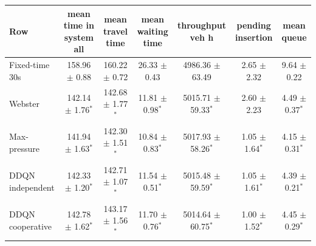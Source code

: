 \begin{tabular}{lcccccc}
\toprule
Row & mean time in system all & mean travel time & mean waiting time & throughput veh h & pending insertion & mean queue \\
\midrule
Fixed-time 30s & 158.96 $\pm$ 0.88 & 160.22 $\pm$ 0.72 & 26.33 $\pm$ 0.43 & 4986.36 $\pm$ 63.49 & 2.65 $\pm$ 2.32 & 9.64 $\pm$ 0.22 \\
Webster & 142.14 $\pm$ 1.76$^{*}$ & 142.68 $\pm$ 1.77$^{*}$ & 11.81 $\pm$ 0.98$^{*}$ & 5015.71 $\pm$ 59.33$^{*}$ & 2.60 $\pm$ 2.23 & 4.49 $\pm$ 0.37$^{*}$ \\
Max-pressure & 141.94 $\pm$ 1.63$^{*}$ & 142.30 $\pm$ 1.51$^{*}$ & 10.84 $\pm$ 0.83$^{*}$ & 5017.93 $\pm$ 58.26$^{*}$ & 1.05 $\pm$ 1.64$^{*}$ & 4.15 $\pm$ 0.31$^{*}$ \\
DDQN independent & 142.33 $\pm$ 1.20$^{*}$ & 142.71 $\pm$ 1.07$^{*}$ & 11.54 $\pm$ 0.51$^{*}$ & 5015.48 $\pm$ 59.59$^{*}$ & 1.05 $\pm$ 1.61$^{*}$ & 4.39 $\pm$ 0.21$^{*}$ \\
DDQN cooperative & 142.78 $\pm$ 1.62$^{*}$ & 143.17 $\pm$ 1.56$^{*}$ & 11.70 $\pm$ 0.76$^{*}$ & 5014.64 $\pm$ 60.75$^{*}$ & 1.00 $\pm$ 1.52$^{*}$ & 4.45 $\pm$ 0.29$^{*}$ \\
\bottomrule
\end{tabular}
